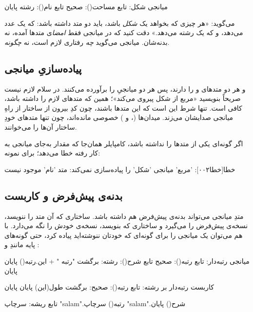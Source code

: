 \begin{salamfa}
میانجی شکل:
    تابع مساحت(): صحیح
    تابع نام(): رشته
پایان
\end{salamfa}

 می‌گوید: «هر چیزی که بخواهد یک \emph{شکل} باشد، باید دو متد
داشته باشد:  که یک عدد می‌دهد، و  که یک رشته می‌دهد.»
دقت کنید که در میانجی فقط \emph{امضا}ی متدها آمده، نه بدنه‌شان. میانجی می‌گوید
\emph{چه} رفتاری لازم است، نه \emph{چگونه}.

\subsection{پیاده‌سازیِ میانجی}

 و  هر دو متدهای  و  را دارند، پس
هر دو میانجیِ  را برآورده می‌کنند. در سلام لازم نیست صریحاً بنویسید
«مربع از شکل پیروی می‌کند»؛ همین که متدهای لازم را داشته باشد، کافی است.
تنها شرط این است که این متدها  باشند، چون کدِ بیرون از ساختار
از راهِ میانجی صدایشان می‌زند. میدان‌ها (،  و )
خصوصی مانده‌اند، چون تنها متدهای خودِ ساختار آن‌ها را می‌خوانند.

اگر گونه‌ای یکی از متدها را نداشته باشد، کامپایلر همان‌جا که مقدار به‌جای
میانجی به کار رفته خطا می‌دهد؛ برای نمونه:

\begin{progoutfa}
خطا[خطا۰۰۲]: 'مربع' میانجی 'شکل' را پیاده‌سازی نمی‌کند: متد 'نام' موجود نیست
\end{progoutfa}

\subsection{بدنه‌ی پیش‌فرض و کاربست}

متدِ میانجی می‌تواند بدنه‌ی پیش‌فرض هم داشته باشد. ساختاری که آن متد را ننویسد،
نسخه‌ی پیش‌فرض را می‌گیرد و ساختاری که بنویسد، نسخه‌ی خودش را نگه می‌دارد. با
 هم می‌توان یک میانجی را برای گونه‌ای که خودتان
ننوشته‌اید پیاده کرد، حتی گونه‌های پایه مانندِ  و :

\begin{salamfa}
میانجی رتبه‌دار:
    تابع رتبه(): صحیح
    تابع شرح(): رشته:
        برگشت "رتبه " + این.رتبه()
    پایان
پایان

کاربست رتبه‌دار بر رشته:
    تابع رتبه(): صحیح: برگشت طول(این) پایان
پایان

تابع ریشه:
    سرچاپ "salam".رتبه()
    سرچاپ "salam".شرح()
پایان
\end{salamfa}


